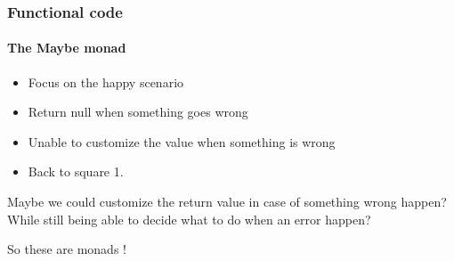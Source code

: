 \begin{frame}
    
\end{frame}

\begin{frame}
    
\end{frame}

\begin{frame}
    
\end{frame}

\begin{frame}
    \frametitle{Functional code}
    \framesubtitle{The Maybe monad}

    \begin{itemize}[<+->]
        \item Focus on the happy scenario
        \item Return null when something goes wrong
        \item Unable to customize the value when something is wrong
        \item Back to square 1.
    \end{itemize}
\end{frame}

\begin{frame}
    Maybe we could customize the return value in case of something wrong happen?\\
    \vspace{1em}
    \pause
    While still being able to decide what to do when an error happen?
\end{frame}

\begin{frame}
    
\end{frame}

\begin{frame}
    \centering
    \Huge So these are monads !
\end{frame}

